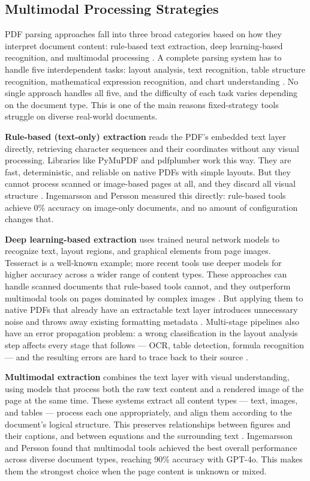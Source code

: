 \documentclass[12pt]{article}
\begin{document}
\subsection{Multimodal Processing Strategies}

PDF parsing approaches fall into three broad categories based on how they
interpret document content: rule-based text extraction, deep learning-based
recognition, and multimodal processing \cite{ingemarsson2024}. A complete
parsing system has to handle five interdependent tasks: layout analysis, text
recognition, table structure recognition, mathematical expression recognition,
and chart understanding \cite{subramani2020}. No single approach handles all
five, and the difficulty of each task varies depending on the document type.
This is one of the main reasons fixed-strategy tools struggle on diverse
real-world documents.

\textbf{Rule-based (text-only) extraction} reads the PDF's embedded text layer
directly, retrieving character sequences and their coordinates without any
visual processing. Libraries like PyMuPDF and pdfplumber work this way. They
are fast, deterministic, and reliable on native PDFs with simple layouts. But
they cannot process scanned or image-based pages at all, and they discard all
visual structure \cite{meuschke2023}. Ingemarsson and Persson
\cite{ingemarsson2024} measured this directly: rule-based tools achieve 0\%
accuracy on image-only documents, and no amount of configuration changes that.

\textbf{Deep learning-based extraction} uses trained neural network models to
recognize text, layout regions, and graphical elements from page images.
Tesseract is a well-known example; more recent tools use deeper models for
higher accuracy across a wider range of content types. These approaches can
handle scanned documents that rule-based tools cannot, and they outperform
multimodal tools on pages dominated by complex images \cite{ingemarsson2024}.
But applying them to native PDFs that already have an extractable text layer
introduces unnecessary noise and throws away existing formatting metadata
\cite{meuschke2023}. Multi-stage pipelines also have an error propagation
problem: a wrong classification in the layout analysis step affects every
stage that follows --- OCR, table detection, formula recognition --- and the
resulting errors are hard to trace back to their source \cite{duan2025}.

\textbf{Multimodal extraction} combines the text layer with visual
understanding, using models that process both the raw text content and a
rendered image of the page at the same time. These systems extract all content
types --- text, images, and tables --- process each one appropriately, and
align them according to the document's logical structure. This preserves
relationships between figures and their captions, and between equations and
the surrounding text \cite{ingemarsson2024}. Ingemarsson and Persson
\cite{ingemarsson2024} found that multimodal tools achieved the best overall
performance across diverse document types, reaching 90\% accuracy with GPT-4o.
This makes them the strongest choice when the page content is unknown or mixed.
\end{document}
